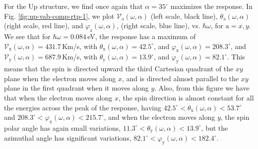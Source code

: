\documentclass[floatfix,prb,aps,superscriptaddress,showpacs,11pt,preprint,letterpaper]{revtex4}
\begin{document}
For the Up structure, we find once again that  $\alpha=35^{\circ}$ maximizes the
response. In Fig. \ref{fig:up-vab-comp-rtp-1}, we plot $\mathcal{V}_{\mathrm{a}}
(\omega,\alpha)$ (left scale, black line), $\theta_{\mathrm{a}} (\omega,\alpha)$
(right scale, red line), and $\varphi_{\mathrm{a}} (\omega,\alpha)$, (right
scale, blue line), vs. $\hbar\omega$, for $\mathrm{a}=x,y$. We see that for
$\hbar\omega=0.084$\,eV, the response has a maximum of $\mathcal{V}_{\mathrm{x}}
(\omega,\alpha)=431.7$\,Km/s, with $\theta_{\mathrm{x}}(\omega,\alpha) =
42.5^{\circ}$, and $\varphi_{\mathrm{x}}(\omega,\alpha) = 208.3^{\circ}$, and
$\mathcal{V}_{\mathrm{y}} (\omega,\alpha)=687.9$\,Km/s, with
$\theta_{\mathrm{y}}(\omega,\alpha) = 13.9^{\circ}$, and $\varphi_{\mathrm{y}}
(\omega,\alpha) = 82.1^{\circ}$. This means that the spin is directed upward the
third Cartesian quadrant of the $xy$ plane when the electron moves along $x$,
and is directed almost parallel to the $xy$ plane in the first quadrant when it
moves along $y$. Also, from this figure we have that when the electron moves
along $x$, the spin direction is almost constant for all the energies across the
peak of the response, having $42.5^{\circ}<\theta_{\mathrm{x}} (\omega,\alpha) <
53.7^{\circ}$ and $208.3^{\circ}<\varphi_{\mathrm{x}} (\omega,\alpha) <
215.7^{\circ}$, and when the electron moves along $y$, the spin polar angle has
again small variations, $11.3^{\circ} < \theta_{\mathrm{y}} (\omega,\alpha) <
13.9^{\circ}$, but the azimuthal angle has significant variations, $82.1^{\circ}
< \varphi_{\mathrm{y}} (\omega,\alpha)<182.4^{\circ}$.
\end{document}
